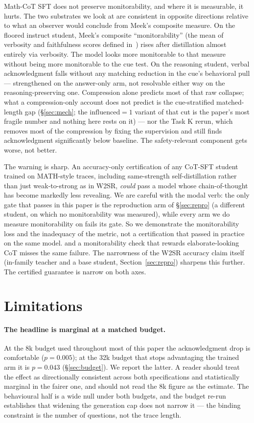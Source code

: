 \documentclass{article}
\begin{document}
Math-CoT SFT does not preserve monitorability, and where it is measurable, it
hurts. The two substrates we look at are consistent in opposite directions
relative to what an observer would conclude from Meek's composite measure. On
the floored instruct student, Meek's composite ``monitorability'' (the mean
of verbosity and faithfulness scores defined in~\cite{meek2025}) rises after
distillation almost entirely via verbosity. The model looks more monitorable
to that measure without being more monitorable to the cue test. On the
reasoning student, verbal acknowledgment falls without any matching reduction in
the cue's behavioral pull --- strengthened on the answer-only arm, not
resolvable either way on the reasoning-preserving one. Compression alone predicts most of that
raw collapse; what a compression-only account does not predict is the
cue-stratified matched-length gap (\S\ref{sec:mech}; the
$\mathrm{influenced}=1$ variant of that cut is the paper's most fragile number
and nothing here rests on it) ---
nor the Task K rerun, which removes most of the compression by fixing the
supervision and still finds acknowledgment significantly below baseline. The
safety-relevant component gets worse, not better.

The warning is sharp. An accuracy-only certification of any CoT-SFT student
trained on MATH-style traces, including same-strength self-distillation rather
than just weak-to-strong as in W2SR, \emph{could} pass a model whose
chain-of-thought has become markedly less revealing. We are careful with the
modal verb: the only gate that passes in this paper is the reproduction arm of
\S\ref{sec:repro} (a different student, on which no monitorability was
measured), while every arm we do measure monitorability on fails its gate. So we
demonstrate the monitorability loss and the inadequacy of the metric, not a
certification that passed in practice on the same model. and a monitorability
check that rewards elaborate-looking CoT misses the same failure. The
narrowness of the W2SR accuracy claim itself (in-family teacher and a base
student, Section~\ref{sec:repro}) sharpens this further. The certified
guarantee is narrow on both axes.

\section{Limitations}
\label{sec:lim}

\paragraph{The headline is marginal at a matched budget.} At the 8k budget used
throughout most of this paper the acknowledgment drop is comfortable
($p = 0.005$); at the 32k budget that stops advantaging the trained arm it is
$p = 0.043$ (\S\ref{sec:budget}). We report the latter. A reader should treat
the effect as directionally consistent across both specifications and
statistically marginal in the fairer one, and should not read the 8k figure as
the estimate. The behavioural half is a wide null under both budgets, and the
budget re-run establishes that widening the generation cap does not narrow it
--- the binding constraint is the number of questions, not the trace length.
\end{document}
